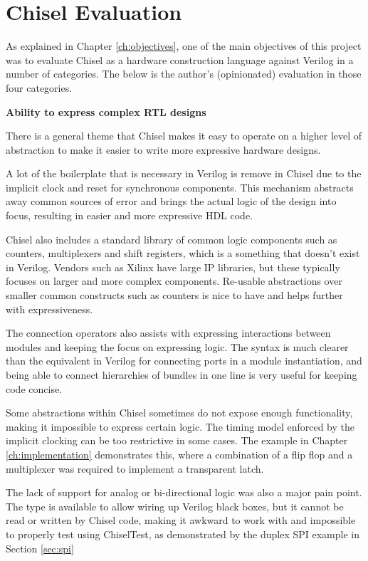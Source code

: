 \section{Chisel Evaluation}

As explained in Chapter \ref{ch:objectives}, one of the main objectives of this project was to evaluate Chisel as a hardware construction language against Verilog in a number of categories. The below is the author's (opinionated) evaluation in those four categories.

\textbf{Ability to express complex RTL designs}

There is a general theme that Chisel makes it easy to operate on a higher level of abstraction to make it easier to write more expressive hardware designs.

A lot of the boilerplate that is necessary in Verilog is remove in Chisel due to the implicit clock and reset for synchronous components. This mechanism abstracts away common sources of error and brings the actual logic of the design into focus, resulting in easier and more expressive HDL code.

Chisel also includes a standard library of common logic components such as counters, multiplexers and shift registers, which is a something that doesn't exist in Verilog. Vendors such as Xilinx have large IP libraries, but these typically focuses on larger and more complex components. Re-usable abstractions over smaller common constructs such as counters is nice to have and helps further with expressiveness.

The connection operators also assists with expressing interactions between modules and keeping the focus on expressing logic. The syntax is much clearer than the equivalent in Verilog for connecting ports in a module instantiation, and being able to connect hierarchies of bundles in one line is very useful for keeping code concise.

Some abstractions within Chisel sometimes do not expose enough functionality, making it impossible to express certain logic. The timing model enforced by the implicit clocking can be too restrictive in some cases. The example in Chapter \ref{ch:implementation} demonstrates this, where a combination of a flip flop and a multiplexer was required to implement a transparent latch.

The lack of support for analog or bi-directional logic was also a major pain point. The  type is available to allow wiring up Verilog black boxes, but it cannot be read or written by Chisel code, making it awkward to work with and impossible to properly test using ChiselTest, as demonstrated by the duplex SPI example in Section \ref{sec:spi}

